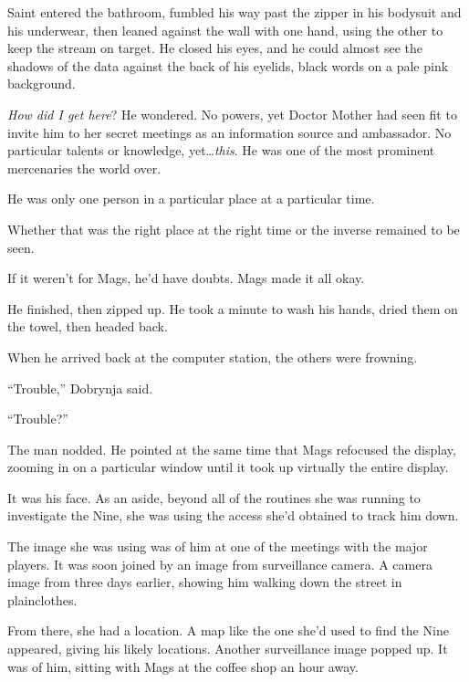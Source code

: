 Saint entered the bathroom, fumbled his way past the zipper in his bodysuit and his underwear, then leaned against the wall with one hand, using the other to keep the stream on target.  He closed his eyes, and he could almost see the shadows of the data against the back of his eyelids, black words on a pale pink background.



\emph{How did I get here}? He wondered.  No powers, yet Doctor Mother had seen fit to invite him to her secret meetings as an information source and ambassador.  No particular talents or knowledge, yet\ldots \emph{this}.  He was one of the most prominent mercenaries the world over.



He was only one person in a particular place at a particular time.



Whether that was the right place at the right time or the inverse remained to be seen.



If it weren't for Mags, he'd have doubts.  Mags made it all okay.



He finished, then zipped up.  He took a minute to wash his hands, dried them on the towel, then headed back.



When he arrived back at the computer station, the others were frowning.



``Trouble,'' Dobrynja said.



``Trouble?''



The man nodded.  He pointed at the same time that Mags refocused the display, zooming in on a particular window until it took up virtually the entire display.



It was his face.  As an aside, beyond all of the routines she was running to investigate the Nine, she was using the access she'd obtained to track him down.



The image she was using was of him at one of the meetings with the major players.  It was soon joined by an image from surveillance camera.  A camera image from three days earlier, showing him walking down the street in plainclothes.



From there, she had a location.  A map like the one she'd used to find the Nine appeared, giving his likely locations.  Another surveillance image popped up.  It was of him, sitting with Mags at the coffee shop an hour away.



